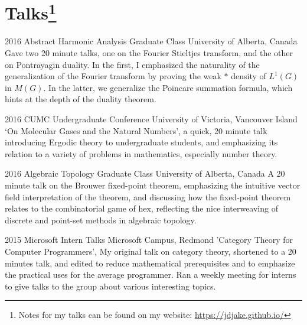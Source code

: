 \documentclass{friggeri-cv} %
\begin{document}

\pagebreak[3]
\section{Talks\footnote{Notes for my talks can be found on my website: \href{https://jdjake.github.io/}{https://jdjake.github.io/}}} %

\begin{entrylist}


\entry
{2016}
{Abstract Harmonic Analysis Graduate Class}
{University of Alberta, Canada}
{Gave two 20 minute talks, one on the Fourier Stieltjes transform, and the other on Pontrayagin duality. In the first, I emphasized the naturality of the generalization of the Fourier transform by proving the weak $*$ density of $L^1(G)$ in $M(G)$. In the latter, we generalize the Poincare summation formula, which hints at the depth of the duality theorem.}


\entry
{2016}
{CUMC Undergraduate Conference}
{University of Victoria, Vancouver Island}
{`On Molecular Gases and the Natural Numbers', a quick, 20 minute talk introducing Ergodic theory to undergraduate students, and emphasizing its relation to a variety of problems in mathematics, especially number theory.}


\entry
{2016}
{Algebraic Topology Graduate Class}
{University of Alberta, Canada}
{A 20 minute talk on the Brouwer fixed-point theorem, emphasizing the intuitive vector field interpretation of the theorem, and discussing how the fixed-point theorem relates to the combinatorial game of hex, reflecting the nice interweaving of discrete and point-set methods in algebraic topology.}


\entry
{2015}
{Microsoft Intern Talks}
{Microsoft Campus, Redmond}
{'Category Theory for Computer Programmers', My original talk on category theory, shortened to a 20 minutes talk, and edited to reduce mathematical prerequisites and to emphasize the practical uses for the average programmer. Ran a weekly meeting for interns to give talks to the group about various interesting topics.}


\end{entrylist}
\end{document}
